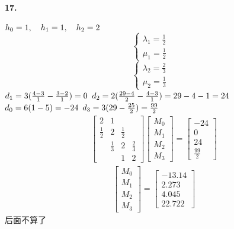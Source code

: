 \documentclass[UTF8]{ctexart}
\begin{document}
	\paragraph{17.}
		$h_0=1,\quad h_1=1, \quad h_2=2\\$
		\begin{equation}
			\left\{
			\begin{array}{lr}
				\lambda_1=\frac{1}{2}&\\
				\mu_1=\frac{1}{2}&
			\end{array}
			\right.
		\end{equation}
		\begin{equation}
			\left\{
			\begin{array}{lr}
				\lambda_2=\frac{2}{3}&\\
				\mu_2=\frac{1}{3}&
			\end{array}
			\right.
		\end{equation}
		$d_1=3(\frac{4-3}{1}-\frac{3-2}{1})=0\\$
		$d_2=2(\frac{29-4}{2}-\frac{4-3}{1})=29-4-1=24\\$
		$d_0=6(1-5)=-24\\$
		$d_3=3(29-\frac{25}{2})=\frac{99}{2}\\$
		\begin{displaymath}
		\begin{gathered}
			\begin{bmatrix}
				2 & 1 & & \\
				\frac{1}{2} & 2 & \frac{1}{2} & \\
				 & \frac{1}{3} & 2 & \frac{2}{3} \\
				 & & 1 & 2
			\end{bmatrix}
			\begin{bmatrix}
				M_0\\M_1\\M_2\\M_3
			\end{bmatrix}
			=
			\begin{bmatrix}
				-24\\0\\24\\\frac{99}{2}
			\end{bmatrix}
		\end{gathered}
		\end{displaymath}
		\begin{displaymath}
		\begin{gathered}
		\begin{bmatrix}
			M_0\\M_1\\M_2\\M_3
		\end{bmatrix}
		=
		\begin{bmatrix}
			-13.14\\
			2.273\\
			4.045\\
			22.722
		\end{bmatrix}
		\end{gathered}
		\end{displaymath}
		后面不算了
\end{document}
